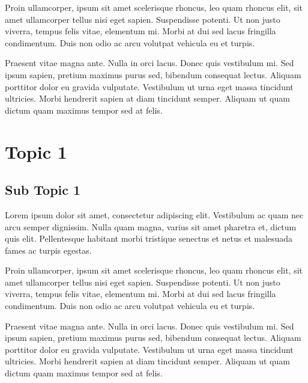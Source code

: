 \documentclass[12pt,a4paper]{report}
\begin{document}
\begin{gbox}
Proin ullamcorper, ipsum sit amet scelerisque rhoncus, leo quam rhoncus elit, sit amet ullamcorper tellus nisi eget sapien. Suspendisse potenti. Ut non justo viverra, tempus felis vitae, elementum mi. Morbi at dui sed lacus fringilla condimentum. Duis non odio ac arcu volutpat vehicula eu et turpis.
\end{gbox}

\begin{gbox}
Praesent vitae magna ante. Nulla in orci lacus. Donec quis vestibulum mi. Sed ipsum sapien, pretium maximus purus sed, bibendum consequat lectus. Aliquam porttitor dolor eu gravida vulputate. Vestibulum ut urna eget massa tincidunt ultricies. Morbi hendrerit sapien at diam tincidunt semper. Aliquam ut quam dictum quam maximus tempor sed at felis.
\end{gbox}

\clearpage
\section{Topic 1}

\subsection{Sub Topic 1}

\begin{gbox}
Lorem ipsum dolor sit amet, consectetur adipiscing elit. Vestibulum ac quam nec arcu semper dignissim. Nulla quam magna, varius sit amet pharetra et, dictum quis elit. Pellentesque habitant morbi tristique senectus et netus et malesuada fames ac turpis egestas.
\end{gbox}

\begin{gbox}
Proin ullamcorper, ipsum sit amet scelerisque rhoncus, leo quam rhoncus elit, sit amet ullamcorper tellus nisi eget sapien. Suspendisse potenti. Ut non justo viverra, tempus felis vitae, elementum mi. Morbi at dui sed lacus fringilla condimentum. Duis non odio ac arcu volutpat vehicula eu et turpis.
\end{gbox}

\begin{gbox}
Praesent vitae magna ante. Nulla in orci lacus. Donec quis vestibulum mi. Sed ipsum sapien, pretium maximus purus sed, bibendum consequat lectus. Aliquam porttitor dolor eu gravida vulputate. Vestibulum ut urna eget massa tincidunt ultricies. Morbi hendrerit sapien at diam tincidunt semper. Aliquam ut quam dictum quam maximus tempor sed at felis.
\end{gbox}
\end{document}
